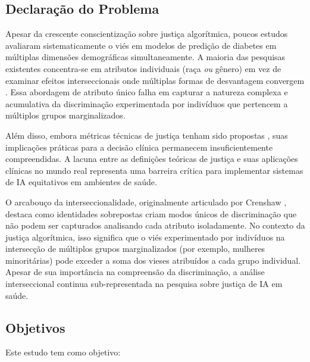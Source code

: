 \subsection{Declaração do Problema}

Apesar da crescente conscientização sobre justiça algorítmica, poucos 
estudos avaliaram sistematicamente o viés em modelos de predição de diabetes 
em múltiplas dimensões demográficas simultaneamente. A maioria das pesquisas 
existentes concentra-se em atributos individuais (raça \textit{ou} gênero) 
em vez de examinar efeitos interseccionais onde múltiplas formas de 
desvantagem convergem \cite{crenshaw1989, buolamwini2018}. Essa abordagem 
de atributo único falha em capturar a natureza complexa e acumulativa da 
discriminação experimentada por indivíduos que pertencem a múltiplos grupos 
marginalizados.

Além disso, embora métricas técnicas de justiça tenham sido propostas 
\cite{corbett2018}, suas implicações práticas para a decisão clínica 
permanecem insuficientemente compreendidas. A lacuna entre as definições 
teóricas de justiça e suas aplicações clínicas no mundo real representa 
uma barreira crítica para implementar sistemas de IA equitativos em 
ambientes de saúde.

O arcabouço da interseccionalidade, originalmente articulado por Crenshaw 
\cite{crenshaw1989}, destaca como identidades sobrepostas criam modos 
únicos de discriminação que não podem ser capturados analisando cada 
atributo isoladamente. No contexto da justiça algorítmica, isso significa 
que o viés experimentado por indivíduos na intersecção de múltiplos grupos 
marginalizados (por exemplo, mulheres minoritárias) pode exceder a soma 
dos vieses atribuídos a cada grupo individual. Apesar de sua importância 
na compreensão da discriminação, a análise interseccional continua 
sub-representada na pesquisa sobre justiça de IA em saúde.

\subsection{Objetivos}

Este estudo tem como objetivo:

